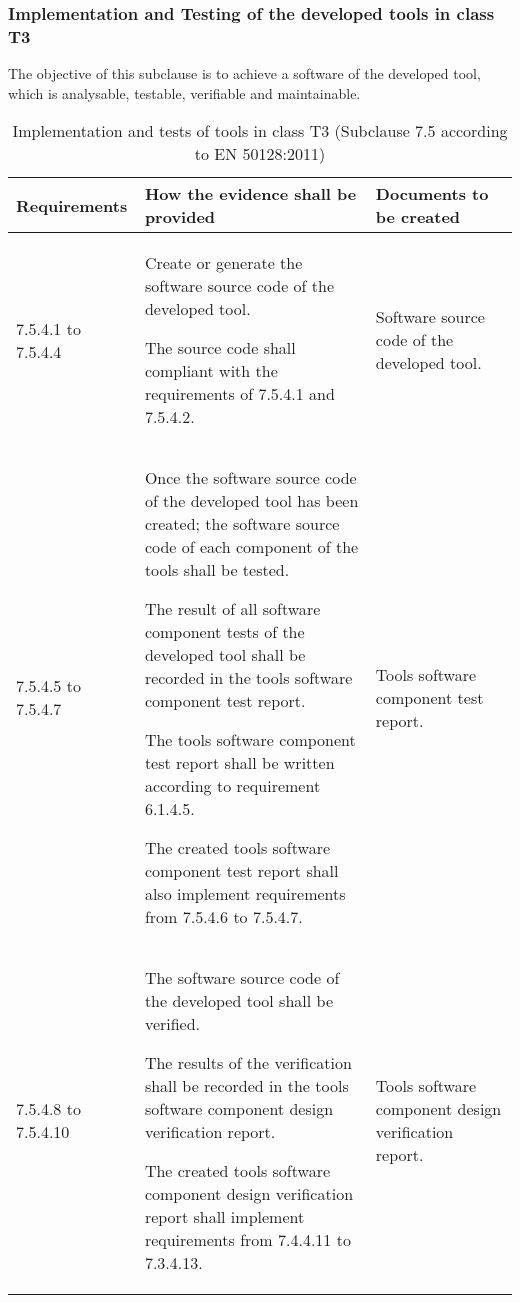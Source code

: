 \documentclass{template/openetcs_report}
\begin{document}
\subsubsection{Implementation and Testing of the developed tools in class T3}
\begin{flushleft}
The objective of this subclause is to achieve a software of the developed tool, which is analysable, testable, verifiable and maintainable.
\end{flushleft}
{\footnotesize\sffamily\centering
\begin{longtable}{|p{2cm}|p{9cm}|p{3cm}|}
\caption{Implementation and tests of tools in class T3 (Subclause 7.5 according to EN 50128:2011)}\\
\hline
\bfseries Requirements & \bfseries How the evidence shall be provided & \bfseries Documents to be created\\
\hline
\hline
\endhead
\hline
\endfoot

7.5.4.1 to 7.5.4.4 & Create or generate the software source code of the developed tool.

The source code shall compliant with the requirements of 7.5.4.1 and 7.5.4.2.
& Software source code of the developed tool.\\ 
\hline
7.5.4.5 to 7.5.4.7 & Once the software source code of the developed tool has been created; the software source code of each component of the tools shall be tested.

The result of all software component tests of the developed tool shall be recorded in the tools software component test report.

The tools software component test report shall be written according to requirement 6.1.4.5.

The created tools software component test report shall also implement requirements from 7.5.4.6 to 7.5.4.7.
& Tools software component test report.\\ 
\hline
7.5.4.8 to 7.5.4.10 & The software source code of the developed tool shall be verified.

The results of the verification shall be recorded in the tools software component design verification report.

The created tools software component design verification report shall implement requirements from 7.4.4.11 to 7.3.4.13.
& Tools software component design verification report.\\ 
\hline
\end{longtable}}
\end{document}

